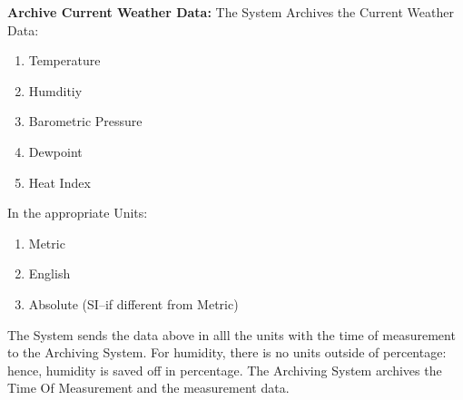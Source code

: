 \documentclass[letterpaper]{article}
\begin{document}
\noindent
\textbf{Archive Current Weather Data:  }The System Archives the
Current Weather Data:
\begin{enumerate}
\item Temperature
\item Humditiy
\item Barometric Pressure
\item Dewpoint
\item Heat Index
\end{enumerate}
In the appropriate Units:
\begin{enumerate}
\item Metric
\item English
\item Absolute (SI--if different from Metric)
\end{enumerate}
The System sends the data above in alll the units with the time of
measurement to the Archiving System.  For humidity, there is no units
outside of percentage:  hence, humidity is saved off in percentage.
The Archiving System archives the Time Of Measurement and the
measurement data.
\end{document}
